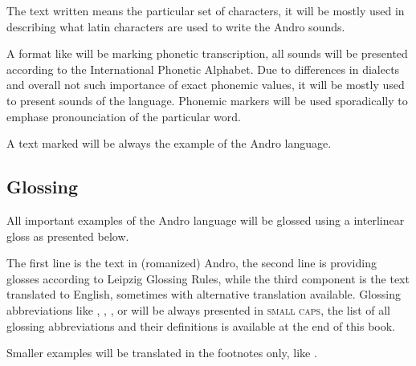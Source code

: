 The text written  means the particular set of characters, it will
be mostly used in describing what latin characters are used to write the Andro
sounds.

A format like  will be marking phonetic transcription, all
sounds will be presented according to the International Phonetic Alphabet. Due
to differences in dialects and overall not such importance of exact phonemic
values, it will be mostly used to present sounds of the language. Phonemic
markers  will be used sporadically to emphase pronounciation of
the particular word.

A text marked  will be always the example of the Andro
language.

\subsection{Glossing}

All important examples of the Andro language will be glossed using a interlinear
gloss as presented below.


The first line is the text in (romanized) Andro, the second line is providing
glosses according to Leipzig Glossing Rules, while the third component is the
text translated to English, sometimes with alternative translation available.
Glossing abbreviations like \Dem{}, \Inan{}, \Rel{}, \Refl{} or \Top{} will be
always presented in \textsc{small caps}, the list of all glossing abbreviations
and their definitions is available at the end of this book.

Smaller examples will be translated in the footnotes only, like
.